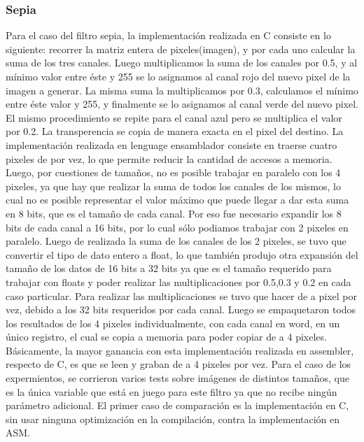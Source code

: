 \documentclass[a4paper]{article}
\begin{document}
\subsubsection{Sepia}
Para el caso del filtro sepia, la implementación realizada en C consiste en lo siguiente: recorrer la matriz entera de pixeles(imagen), y por cada uno calcular la suma de los tres canales. Luego multiplicamos la suma de los canales por 0.5, y al mínimo valor entre éste y 255 se lo asignamos al canal rojo del nuevo pixel de la imagen a generar. La misma suma la multiplicamos por 0.3, calculamos el mínimo entre éste valor y 255, y finalmente se lo asignamos al canal verde del nuevo pixel. El mismo procedimiento se repite para el canal azul pero se multiplica el valor por 0.2. La transperencia se copia de manera exacta en el pixel del destino. La implementación realizada en lenguage ensamblador consiste en traerse cuatro pixeles de por vez, lo que permite reducir la cantidad de accesos a memoria. Luego, por cuestiones de tamaños, no es posible trabajar en paralelo con los 4 pixeles, ya que hay que realizar la suma de todos los canales de los mismos, lo cual no es posible representar el valor máximo que puede llegar a dar esta suma en 8 bits, que es el tamaño de cada canal. Por eso fue necesario expandir los 8 bits de cada canal a 16 bits, por lo cual sólo podiamos trabajar con 2 pixeles en paralelo. Luego de realizada la suma de los canales de los 2 pixeles, se tuvo que convertir el tipo de dato entero a float, lo que también produjo otra expansión del tamaño de los datos de 16 bits a 32 bits ya que es el tamaño requerido para trabajar con floats y poder realizar las multiplicaciones por 0.5,0.3 y 0.2 en cada caso particular. Para realizar las multiplicaciones se tuvo que hacer de a pixel por vez, debido a los 32 bits requeridos por cada canal. Luego se empaquetaron todos los resultados de los 4 pixeles individualmente, con cada canal en word, en un único registro, el cual se copia a memoria para poder copiar de a 4 pixeles. Básicamente, la mayor ganancia con esta implementación realizada en assembler, respecto de C, es que se leen y graban de a 4 pixeles por vez.
\newline
Para el caso de los expermientos, se corrieron varios tests sobre imágenes de distintos tamaños, que es la única variable que está en juego para este filtro ya que no recibe ningún parámetro adicional.
\newline
El primer caso de comparación es la implementación en C, sin usar ninguna optimización en la compilación, contra la implementación en ASM.
\end{document}
